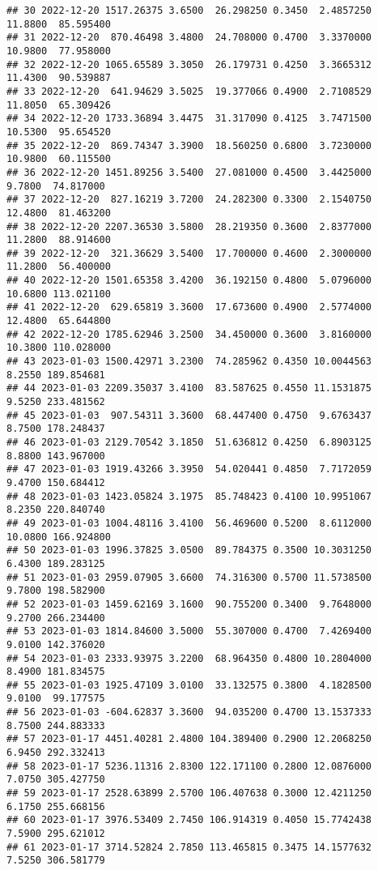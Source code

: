 \documentclass[
]{article}
\begin{document}
\begin{verbatim}
## 30 2022-12-20 1517.26375 3.6500  26.298250 0.3450  2.4857250 11.8800  85.595400
## 31 2022-12-20  870.46498 3.4800  24.708000 0.4700  3.3370000 10.9800  77.958000
## 32 2022-12-20 1065.65589 3.3050  26.179731 0.4250  3.3665312 11.4300  90.539887
## 33 2022-12-20  641.94629 3.5025  19.377066 0.4900  2.7108529 11.8050  65.309426
## 34 2022-12-20 1733.36894 3.4475  31.317090 0.4125  3.7471500 10.5300  95.654520
## 35 2022-12-20  869.74347 3.3900  18.560250 0.6800  3.7230000 10.9800  60.115500
## 36 2022-12-20 1451.89256 3.5400  27.081000 0.4500  3.4425000  9.7800  74.817000
## 37 2022-12-20  827.16219 3.7200  24.282300 0.3300  2.1540750 12.4800  81.463200
## 38 2022-12-20 2207.36530 3.5800  28.219350 0.3600  2.8377000 11.2800  88.914600
## 39 2022-12-20  321.36629 3.5400  17.700000 0.4600  2.3000000 11.2800  56.400000
## 40 2022-12-20 1501.65358 3.4200  36.192150 0.4800  5.0796000 10.6800 113.021100
## 41 2022-12-20  629.65819 3.3600  17.673600 0.4900  2.5774000 12.4800  65.644800
## 42 2022-12-20 1785.62946 3.2500  34.450000 0.3600  3.8160000 10.3800 110.028000
## 43 2023-01-03 1500.42971 3.2300  74.285962 0.4350 10.0044563  8.2550 189.854681
## 44 2023-01-03 2209.35037 3.4100  83.587625 0.4550 11.1531875  9.5250 233.481562
## 45 2023-01-03  907.54311 3.3600  68.447400 0.4750  9.6763437  8.7500 178.248437
## 46 2023-01-03 2129.70542 3.1850  51.636812 0.4250  6.8903125  8.8800 143.967000
## 47 2023-01-03 1919.43266 3.3950  54.020441 0.4850  7.7172059  9.4700 150.684412
## 48 2023-01-03 1423.05824 3.1975  85.748423 0.4100 10.9951067  8.2350 220.840740
## 49 2023-01-03 1004.48116 3.4100  56.469600 0.5200  8.6112000 10.0800 166.924800
## 50 2023-01-03 1996.37825 3.0500  89.784375 0.3500 10.3031250  6.4300 189.283125
## 51 2023-01-03 2959.07905 3.6600  74.316300 0.5700 11.5738500  9.7800 198.582900
## 52 2023-01-03 1459.62169 3.1600  90.755200 0.3400  9.7648000  9.2700 266.234400
## 53 2023-01-03 1814.84600 3.5000  55.307000 0.4700  7.4269400  9.0100 142.376020
## 54 2023-01-03 2333.93975 3.2200  68.964350 0.4800 10.2804000  8.4900 181.834575
## 55 2023-01-03 1925.47109 3.0100  33.132575 0.3800  4.1828500  9.0100  99.177575
## 56 2023-01-03 -604.62837 3.3600  94.035200 0.4700 13.1537333  8.7500 244.883333
## 57 2023-01-17 4451.40281 2.4800 104.389400 0.2900 12.2068250  6.9450 292.332413
## 58 2023-01-17 5236.11316 2.8300 122.171100 0.2800 12.0876000  7.0750 305.427750
## 59 2023-01-17 2528.63899 2.5700 106.407638 0.3000 12.4211250  6.1750 255.668156
## 60 2023-01-17 3976.53409 2.7450 106.914319 0.4050 15.7742438  7.5900 295.621012
## 61 2023-01-17 3714.52824 2.7850 113.465815 0.3475 14.1577632  7.5250 306.581779

\end{verbatim}
\end{document}
